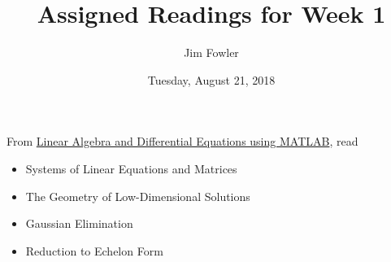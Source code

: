 \documentclass{homework}
\author{Jim Fowler}
\title{Assigned Readings for Week 1}
\date{Tuesday, August 21, 2018}
\begin{document}
\maketitle

From \href{/courses/43735/files/folder/textbooks}{Linear Algebra and Differential Equations using MATLAB}, read 
\begin{itemize}
\item {} Systems of Linear Equations and Matrices
\item {} The Geometry of Low-Dimensional Solutions
\item {} Gaussian Elimination
\item {} Reduction to Echelon Form
\end{itemize}
\end{document}
